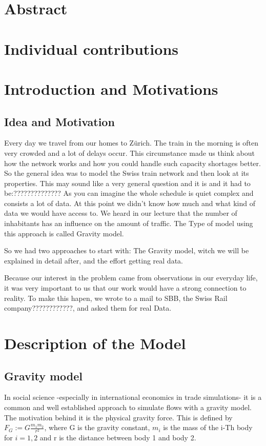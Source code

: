 \documentclass[11pt]{article}
\begin{document}
\section{Abstract}

\section{Individual contributions}

\section{Introduction and Motivations}

\subsection{Idea and Motivation}


Every day we travel from our homes to Zürich. The train in the morning is often very crowded and a lot of delays occur. This circumstance made us think about how the network works and how you could handle such capacity shortages better. 
So the general idea was to model the Swiss train network and then look at its properties. This may sound like a very general question and it is and it had to be:?????????????? As you can imagine the whole schedule is quiet complex and consists a lot of data. At this point we didn't know how much and what kind of data we would have access to. We heard in our lecture that the number of inhabitants has an influence on the amount of traffic. The Type of model using this approach is called Gravity model.

So we had two approaches to start with: The Gravity model, witch we will be explained in detail after, and the effort getting real data.

Because our interest in the problem came from observations in our everyday life, it was very important to us that our work would have a strong connection to reality. To make this hapen, we wrote to a mail to SBB, the Swiss Rail company????????????, and asked them for real Data. 


\section{Description of the Model}
\subsection{Gravity model}
In  social science -especially in international economics in trade simulations- it is a common and well established approach to simulate flows with a gravity model. The motivation behind it is the physical gravity force. This is defined by $F_G:=G\frac{m_1 m_2}{r^2}$, where G is the gravity constant, $m_i$ is the mass of the  i-Th body for $i=1,2$ and r is the distance between body 1 and body 2.
\end{document}
